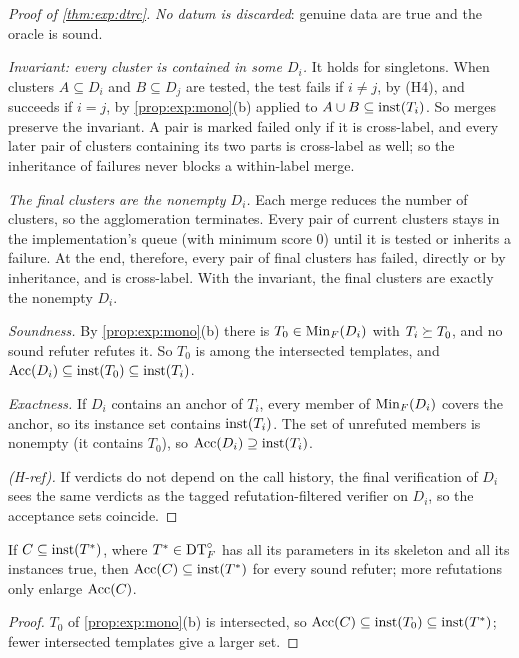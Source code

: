 \begin{proof}[Proof of \cref{thm:exp:dtrc}]
\emph{No datum is discarded}: genuine data are true and the oracle is sound.

\emph{Invariant: every cluster is contained in some $D_i$.} It holds for singletons. When clusters $A\subseteq D_i$ and $B\subseteq D_j$ are tested, the test fails if $i\neq j$, by (H4), and succeeds if $i=j$, by \cref{prop:exp:mono}(b) applied to $A\cup B\subseteq\mathrm{inst}(T_i)$. So merges preserve the invariant. A pair is marked failed only if it is cross-label, and every later pair of clusters containing its two parts is cross-label as well; so the inheritance of failures never blocks a within-label merge.

\emph{The final clusters are the nonempty $D_i$.} Each merge reduces the number of clusters, so the agglomeration terminates. Every pair of current clusters stays in the implementation's queue (with minimum score $0$) until it is tested or inherits a failure. At the end, therefore, every pair of final clusters has failed, directly or by inheritance, and is cross-label. With the invariant, the final clusters are exactly the nonempty $D_i$.

\emph{Soundness.} By \cref{prop:exp:mono}(b) there is $T_0\in\mathrm{Min}_F(D_i)$ with $T_i\succeq T_0$, and no sound refuter refutes it. So $T_0$ is among the intersected templates, and $\mathrm{Acc}(D_i)\subseteq\mathrm{inst}(T_0)\subseteq\mathrm{inst}(T_i)$.

\emph{Exactness.} If $D_i$ contains an anchor of $T_i$, every member of $\mathrm{Min}_F(D_i)$ covers the anchor, so its instance set contains $\mathrm{inst}(T_i)$. The set of unrefuted members is nonempty (it contains $T_0$), so $\mathrm{Acc}(D_i)\supseteq\mathrm{inst}(T_i)$.

\emph{(H-ref).} If verdicts do not depend on the call history, the final verification of $D_i$ sees the same verdicts as the tagged refutation-filtered verifier on $D_i$, so the acceptance sets coincide.
\end{proof}

\begin{proposition}\label{prop:exp:budget}
If $C\subseteq\mathrm{inst}(T^*)$, where $T^*\in\mathrm{DT}^{\circ}_{F}$ has all its parameters in its skeleton and all its instances true, then $\mathrm{Acc}(C)\subseteq\mathrm{inst}(T^*)$ for every sound refuter; more refutations only enlarge $\mathrm{Acc}(C)$.
\end{proposition}

\begin{proof}
$T_0$ of \cref{prop:exp:mono}(b) is intersected, so $\mathrm{Acc}(C)\subseteq\mathrm{inst}(T_0)\subseteq\mathrm{inst}(T^*)$; fewer intersected templates give a larger set.
\end{proof}

